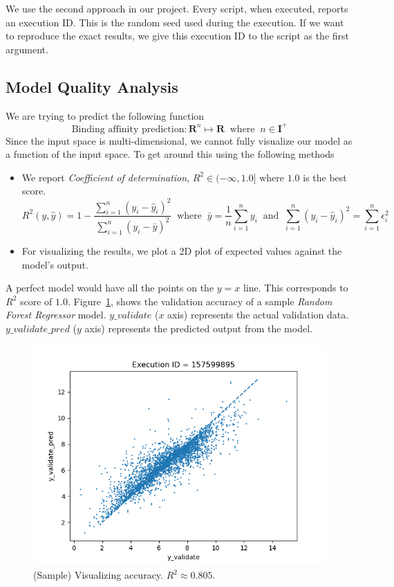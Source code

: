 \documentclass[11pt]{article}
\begin{document}
We use the second approach in our project. Every script, when executed, reports an execution ID. This is the random seed used during the execution. If we want to reproduce the exact results, we give this execution ID to the script as the first argument.

\subsection{Model Quality Analysis}
We are trying to predict the following function
$$ \textrm{Binding affinity prediction} : \mathbf{R}^n \mapsto \mathbf{R} \;\; \textrm{where} \;\; n \in \mathbf{I}^+$$
Since the input space is multi-dimensional, we cannot fully visualize our model as a function of the input space.
To get around this using the following methods
\begin{itemize}
\item We report \textit{Coefficient of determination}, $R^2  \in (- \infty, 1.0]$ where $1.0$ is the best score. \cite{r_squared_score}
$$R^2(y, \hat{y}) = 1 - \frac{\sum_{i=1}^{n} (y_i - \hat{y}_i)^2}{\sum_{i=1}^{n} (y_i - \bar{y})^2} \;\; \textrm{where} \;\; \bar{y} = \frac{1}{n} \sum_{i=1}^{n} y_i \;\;
\textrm{and} \;\; \sum_{i=1}^{n} (y_i - \hat{y}_i)^2 = \sum_{i=1}^{n} \epsilon_i^2$$

\item For visualizing the results,  we plot a 2D plot of expected values against the model's output. 
\end{itemize}

A perfect model would have all the points on the $y = x$ line.  This corresponds to $R^2$ score of $1.0$. 
Figure~\ref{fig:modelQualityVisualization},  shows the validation accuracy of a sample \textit{Random Forest Regressor} model.
$y\_validate$ ($x$ axis) represents the actual validation data.
$y\_validate\_pred$ ($y$ axis) represents the predicted output from the model.

\begin{figure}[htb]
  \centering
    \includegraphics[width=1.0\textwidth]{images/accuracy_validate}
    \caption{(Sample) Visualizing accuracy.  $R^2 \approx 0.805$.}
    \label{fig:modelQualityVisualization}
\end{figure}
\end{document}
